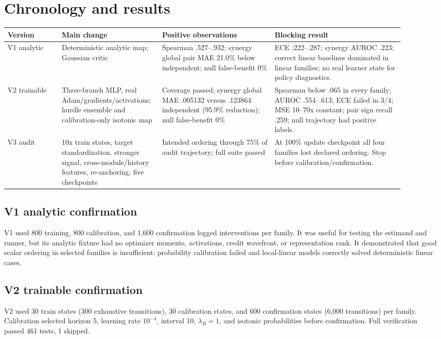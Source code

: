 \documentclass[11pt]{article}
\begin{document}
\section{Chronology and results}
\begin{longtable}{p{0.13\linewidth}p{0.20\linewidth}p{0.27\linewidth}p{0.31\linewidth}}
\toprule
Version & Main change & Positive observations & Blocking result\\
\midrule
\endhead
V1 analytic & Deterministic analytic map; Gaussian critic & Spearman .527--.932; synergy global pair MAE 21.0\% below independent; null false-benefit 0\% & ECE .222--.287; synergy AUROC .223; correct linear baselines dominated in linear families; no real learner state for policy diagnostics.\\
V2 trainable & Three-branch MLP, real Adam/gradients/activations; hurdle ensemble and calibration-only isotonic map & Coverage passed; synergy global MAE .005132 versus .123864 independent (95.9\% reduction); null false-benefit 0\% & Spearman below .065 in every family; AUROC .554--.613; ECE failed in 3/4; MSE 10--70x constant; pair sign recall .259; null trajectory had positive labels.\\
V3 audit & 10x train states, target standardization, stronger signal, cross-module/history features, re-anchoring, five checkpoints & Intended ordering through 75\% of audit trajectory; full suite passed & At 100\% update checkpoint all four families lost declared ordering. Stop before calibration/confirmation.\\
\bottomrule
\end{longtable}

\subsection{V1 analytic confirmation}
V1 used 800 training, 800 calibration, and 1,600 confirmation logged interventions per family. It was useful for testing the estimand and runner, but its analytic fixture had no optimizer moments, activations, credit wavefront, or representation rank. It demonstrated that good scalar ordering in selected families is insufficient: probability calibration failed and local-linear models correctly solved deterministic linear cases.

\subsection{V2 trainable confirmation}
V2 used 30 train states (300 exhaustive transitions), 30 calibration states, and 600 confirmation states (6,000 transitions) per family. Calibration selected horizon 5, learning rate $10^{-4}$, interval 10, $\lambda_B=1$, and isotonic probabilities before confirmation. Full verification passed 461 tests, 1 skipped.
\end{document}
